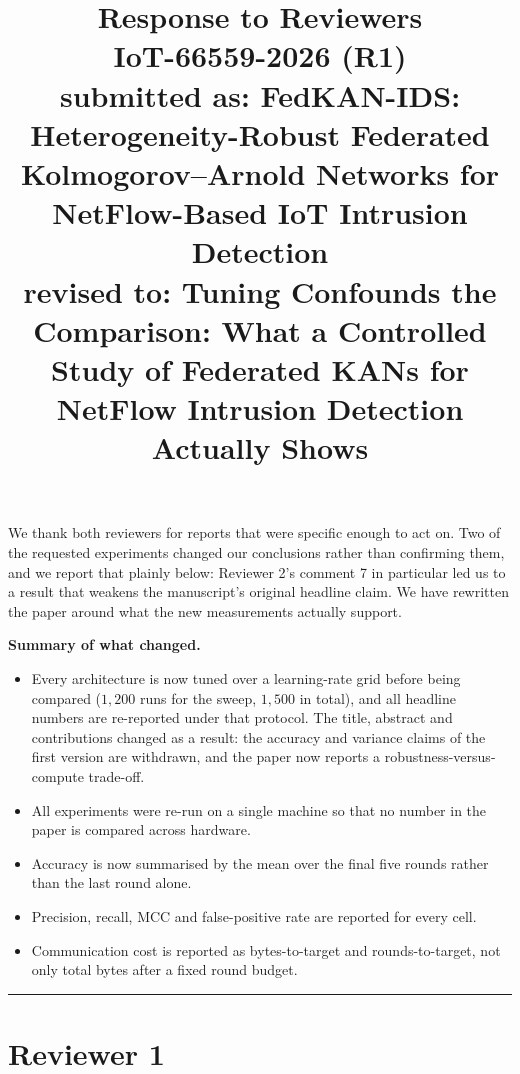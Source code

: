 \documentclass[11pt]{article}
\title{\vspace{-2.2em}Response to Reviewers\\[2pt]
\large IoT-66559-2026 (R1)\\[4pt]
\normalsize submitted as: FedKAN-IDS: Heterogeneity-Robust Federated Kolmogorov--Arnold
Networks for NetFlow-Based IoT Intrusion Detection\\[2pt]
\normalsize revised to: Tuning Confounds the Comparison: What a Controlled Study of
Federated KANs for NetFlow Intrusion Detection Actually Shows}
\author{}
\date{}
\begin{document}
\maketitle
\vspace{-3em}

We thank both reviewers for reports that were specific enough to act on. Two of the
requested experiments changed our conclusions rather than confirming them, and we
report that plainly below: Reviewer 2's comment 7 in particular led us to a result
that weakens the manuscript's original headline claim. We have rewritten the paper
around what the new measurements actually support.

\textbf{Summary of what changed.}
\begin{itemize}[leftmargin=1.4em, itemsep=2pt]
  \item Every architecture is now tuned over a learning-rate grid before being
        compared ($1{,}200$ runs for the sweep, $1{,}500$ in total), and all headline numbers are re-reported under that
        protocol. The title, abstract and contributions changed as a result: the accuracy
        and variance claims of the first version are withdrawn, and the paper now reports a
        robustness-versus-compute trade-off.
  \item All experiments were re-run on a single machine so that no number in the
        paper is compared across hardware.
  \item Accuracy is now summarised by the mean over the final five rounds rather
        than the last round alone.
  \item Precision, recall, MCC and false-positive rate are reported for every cell.
  \item Communication cost is reported as bytes-to-target and rounds-to-target, not
        only total bytes after a fixed round budget.
\end{itemize}

\hrule
\section*{Reviewer 1}
\end{document}

